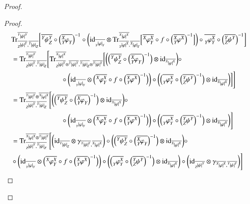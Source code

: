 \documentclass{amsart}
\def\tn{\textnormal}
\def\Trace{\tn{Tr}}
\def\ol{\overline}
\def\id{\tn{id}}
\newcommand{\feeddd}[3]{{\tensor*[^{#2}_{\color{white}{!}}]{{|#1|}}{^{#3}}}}%
\newcommand{\feeddc}[3]{{\tensor*[^{#2}]{{|#1|}}{_{#3}}}}
\newcommand{\feedcd}[3]{{\tensor*[_{#2}]{{|#1|}}{^{#3}}}}
\newcommand{\feedcc}[3]{{\tensor*[^{\color{white}{!}}_{#2}]{{|#1|}}{_{#3}}}}
\newcommand{\feedda}[3]{{\tensor*[^{#2}_{\color{white}{!}}]{{#1}}{^{#2}_{#3}}}}
\newcommand{\feedca}[3]{{\tensor*[_{#2}]{{#1}}{_{#2}^{#3}}}}
\newcommand{\feedad}[3]{{\tensor*[^{#2}_{#3}]{{#1}}{^{#2}}}}
\newcommand{\feedac}[3]{{\tensor*[_{#2}^{#3}]{{#1}}{_{#2}}}}
\theoremstyle{remark}
\theoremstyle{definition}
\begin{document}
\begin{proof}
\begin{proof}
\begin{align*}
&\Trace^{\ol{\feeddd{\psi}{Y}{Y}}}_{\ol{\feedcd{\psi}{Z}{Y}},\ol{\feeddc{\psi}{Y}{Z}}}
\bigg[\ol{\feedda{\psi}{Y}{Z}}\circ\Big(\ol{\feedac{\varphi}{Y}{X}}\Big)^{-1}\circ\bigg(\id_{\ol{\feedcc{\varphi}{Y}{Y}}}\otimes \Trace^{\ol{\feeddd{\varphi}{X}{X}}}_{\ol{\feedcd{\varphi}{Y}{X}},\ol{\feeddc{\varphi}{X}{Y}}}\Big[\ol{\feedda{\varphi}{X}{Y}}\circ f\circ\Big(\ol{\feedad{\varphi}{X}{Y}}\Big)^{-1}\Big]\bigg)\circ\ol{\feedca{\varphi}{Y}{X}}\circ\Big(\ol{\feedad{\psi}{Y}{Z}}\Big)^{-1}\bigg]\\
&=\Trace^{\ol{\feeddd{\psi}{Y}{Y}}}_{\ol{\feedcd{\psi}{Z}{Y}},\ol{\feeddc{\psi}{Y}{Z}}}
\Bigg[\Trace^{\ol{\feeddd{\varphi}{X}{X}}}_{\ol{\feedcd{\psi}{Z}{Y}}\otimes\ol{\feeddd{\psi}{Y}{Y}},\ol{\feeddc{\psi}{Y}{Z}}\otimes\ol{\feeddd{\psi}{Y}{Y}}}\bigg[\bigg(\Big(\ol{\feedda{\psi}{Y}{Z}}\circ\Big(\ol{\feedac{\varphi}{Y}{X}}\Big)^{-1}\Big)\otimes\id_{\ol{\feeddd{\varphi}{X}{X}}}\bigg)\circ\\
&\hspace{1in}\circ\bigg(\id_{\ol{\feedcc{\varphi}{Y}{Y}}}\otimes\Big(\ol{\feedda{\varphi}{X}{Y}}\circ f\circ\Big(\ol{\feedad{\varphi}{X}{Y}}\Big)^{-1}\Big)\bigg)\circ\bigg(\Big(\ol{\feedca{\varphi}{Y}{X}}\circ\Big(\ol{\feedad{\psi}{Y}{Z}}\Big)^{-1}\Big)\otimes\id_{\ol{\feeddd{\varphi}{X}{X}}}\bigg)\bigg]\Bigg]\\
&=\Trace^{\ol{\feeddd{\psi}{Y}{Y}}\otimes\ol{\feeddd{\varphi}{X}{X}}}_{\ol{\feedcd{\psi}{Z}{Y}},\ol{\feeddc{\psi}{Y}{Z}}}\Bigg[
\bigg(\Big(\ol{\feedda{\psi}{Y}{Z}}\circ\Big(\ol{\feedac{\varphi}{Y}{X}}\Big)^{-1}\Big)\otimes\id_{\ol{\feeddd{\varphi}{X}{X}}}\bigg)\circ\\
&\hspace{1in}\circ\bigg(\id_{\ol{\feedcc{\varphi}{Y}{Y}}}\otimes\Big(\ol{\feedda{\varphi}{X}{Y}}\circ f\circ\Big(\ol{\feedad{\varphi}{X}{Y}}\Big)^{-1}\Big)\bigg)\circ\bigg(\Big(\ol{\feedca{\varphi}{Y}{X}}\circ\Big(\ol{\feedad{\psi}{Y}{Z}}\Big)^{-1}\Big)\otimes\id_{\ol{\feeddd{\varphi}{X}{X}}}\bigg)\Bigg]\\
&=\Trace^{\ol{\feeddd{\varphi}{X}{X}}\otimes\ol{\feeddd{\psi}{Y}{Y}}}_{\ol{\feedcd{\psi}{Z}{Y}},\ol{\feeddc{\psi}{Y}{Z}}}\Bigg[
\bigg(\id_{\ol{\feeddc{\psi}{Y}{Z}}}\otimes\gamma_{\ol{\feeddd{\psi}{Y}{Y}},\ol{\feeddd{\varphi}{X}{X}}}\bigg)\circ\bigg(\Big(\ol{\feedda{\psi}{Y}{Z}}\circ\Big(\ol{\feedac{\varphi}{Y}{X}}\Big)^{-1}\Big)\otimes\id_{\ol{\feeddd{\varphi}{X}{X}}}\bigg)\circ\\
&\circ\bigg(\id_{\ol{\feedcc{\varphi}{Y}{Y}}}\otimes\Big(\ol{\feedda{\varphi}{X}{Y}}\circ f\circ\Big(\ol{\feedad{\varphi}{X}{Y}}\Big)^{-1}\Big)\bigg)\circ\bigg(\Big(\ol{\feedca{\varphi}{Y}{X}}\circ\Big(\ol{\feedad{\psi}{Y}{Z}}\Big)^{-1}\Big)\otimes\id_{\ol{\feeddd{\varphi}{X}{X}}}\bigg)\circ\bigg(\id_{\ol{\feedcd{\psi}{Z}{Y}}}\otimes\gamma_{\ol{\feeddd{\varphi}{X}{X}},\ol{\feeddd{\psi}{Y}{Y}}}\bigg)\Bigg]\\

\end{align*}
\end{proof}
\end{proof}
\end{document}
